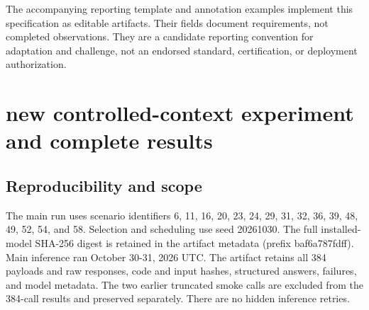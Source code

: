 \documentclass[manuscript,screen,review,anonymous]{acmart}
\begin{document}
The accompanying reporting template and annotation examples implement this specification as editable artifacts. Their fields document requirements, not completed observations. They are a candidate reporting convention for adaptation and challenge, not an endorsed standard, certification, or deployment authorization.

\clearpage
\section{new controlled-context experiment and complete results}

\subsection{Reproducibility and scope}

The main run uses scenario identifiers 6, 11, 16, 20, 23, 24, 29, 31, 32, 36, 39, 48, 49, 52, 54, and 58. Selection and scheduling use seed 20261030. The full installed-model SHA-256 digest is retained in the artifact metadata (prefix baf6a787fdff). Main inference ran October 30-31, 2026 UTC. The artifact retains all 384 payloads and raw responses, code and input hashes, structured answers, failures, and model metadata. The two earlier truncated smoke calls are excluded from the 384-call results and preserved separately. There are no hidden inference retries.
\end{document}
